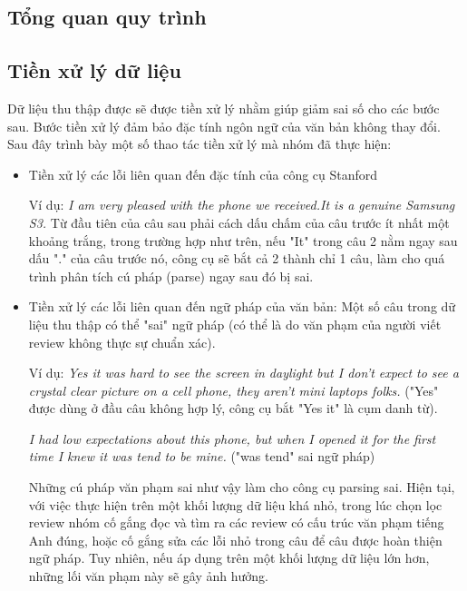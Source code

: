 \documentclass[12pt]{extarticle}
\begin{document}
		\subsection{Tổng quan quy trình}
			\begin{figure}[H]
				\centering				
				
			\end{figure}
		\subsection{Tiền xử lý dữ liệu}
		\par Dữ liệu thu thập được sẽ được tiền xử lý nhằm giúp giảm sai số cho các bước sau. Bước tiền xử lý đảm bảo đặc tính ngôn ngữ của văn bản không thay đổi. Sau đây trình bày một số thao tác tiền xử lý mà nhóm đã thực hiện:
		\begin{itemize}
			\item{Tiền xử lý các lỗi liên quan đến đặc tính của công cụ Stanford
				\par Ví dụ: \textit{I am very pleased with the phone we received.It is a genuine Samsung S3.} Từ đầu tiên của câu sau phải cách dấu chấm của câu trước ít nhất một khoảng trắng, trong trường hợp như trên, nếu "It" trong câu 2 nằm ngay sau dấu "." của câu trước nó, công cụ sẽ bắt cả 2 thành chỉ 1 câu, làm cho quá trình phân tích cú pháp (parse) ngay sau đó bị sai.}
			\item{Tiền xử lý các lỗi liên quan đến ngữ pháp của văn bản: Một số câu trong dữ liệu thu thập có thể "sai" ngữ pháp (có thể là do văn phạm của người viết review không thực sự chuẩn xác). 
				\par Ví dụ: \textit{Yes it was hard to see the screen in daylight but I don't expect to see a crystal clear picture on a cell phone, they aren't mini laptops folks.} ("Yes" được dùng ở đầu câu không hợp lý, công cụ bắt "Yes it" là cụm danh từ).			
				\par \textit{I had low expectations about this phone, but when I opened it for the first time I knew it was tend to be mine.} ("was tend" sai ngữ pháp)
				\par Những cú pháp văn phạm sai như vậy làm cho công cụ parsing sai. Hiện tại, với việc thực hiện trên một khối lượng dữ liệu khá nhỏ, trong lúc chọn lọc review nhóm cố gắng đọc và tìm ra các review có cấu trúc văn phạm tiếng Anh đúng, hoặc cố gắng sửa các lỗi nhỏ trong câu để câu được hoàn thiện ngữ pháp. Tuy nhiên, nếu áp dụng trên một khối lượng dữ liệu lớn hơn, những lối văn phạm này sẽ gây ảnh hưởng.} 
		\end{itemize}
\end{document}
